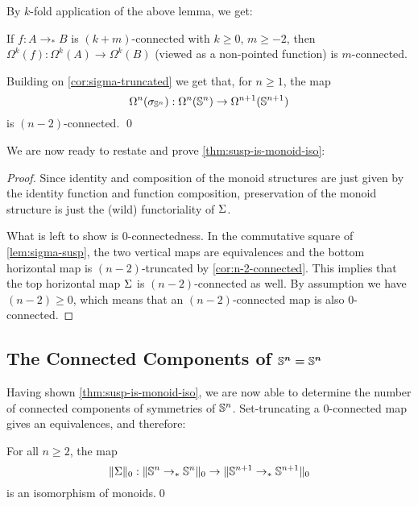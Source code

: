\documentclass[english,a4]{article}
\begin{document}
By $k$-fold application of the above lemma, we get:
\begin{corollary} \label{cor:n-2-connected}
    If $f : A \to_* B$ is $(k+m)$-connected with $k \geq 0$, $m \geq -2$, then
    $\Omega^k(f) : \Omega^k(A) \to \Omega^k(B)$ (viewed as a non-pointed function) is $m$-connected. 
    
    Building on \cref{cor:sigma-truncated} we get that, for $n \geq 1$, the map
    \begin{equation} 
      \loopspace n (\sigma_{\Sn n}) : \Omega^n(\Sn n) \to \Omega^{n+1}(\Sn {n+1})
    \end{equation}
    is $(n-2)$-connected.
    \qed
\end{corollary}

We are now ready to restate and prove \cref{thm:susp-is-monoid-iso}:

\suspiso*
\begin{proof}
    Since identity and composition of the monoid structures are just given by the identity function and function composition,
    preservation of the monoid structure is just the (wild) functoriality of $\susp$.
    
    What is left to show is $0$-connectedness.
    In the commutative square of \cref{lem:sigma-susp}, the two vertical maps are equivalences and the bottom horizontal map is $(n-2)$-truncated by \cref{cor:n-2-connected}.
    This implies that the top horizontal map $\susp$ is $(n-2)$-connected as well.
    By assumption we have $(n-2) \geq 0$, which means that an $(n-2)$-connected map is also $0$-connected.
\end{proof}

\subsection{The Connected Components of $\boldsymbol{\Sn n = \Sn n}$}

Having shown \cref{thm:susp-is-monoid-iso}, we are now able to determine the number of connected components of symmetries of $\Sn n$.
Set-truncating a $0$-connected map gives an equivalences, and therefore:
\begin{corollary} \label{cor:iso-of-monoids}
    For all $n \geq 2$, the map
    \begin{equation}
    \higherTrunc 0 {\susp} : \higherTrunc 0 {\Sn n \to_* \Sn n} \to \higherTrunc 0 {\Sn {n+1} \to_* \Sn {n+1}}
    \end{equation}
    is an isomorphism of monoids.\qed
\end{corollary}
\end{document}
